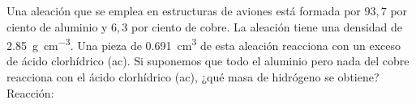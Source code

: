 Una aleación que se emplea en estructuras de aviones está formada por $93,7$ por ciento de aluminio y $6,3$ por ciento de cobre. La aleación tiene una densidad de \SI{2,85}{\gram\per\cubic\centi\meter}. Una pieza de \SI{0,691}{\cubic\centi\meter} de esta aleación reacciona con un exceso de ácido clorhídrico (ac). Si suponemos que todo el aluminio pero nada del cobre reacciona con el ácido clorhídrico (ac), ¿qué masa de hidrógeno se obtiene?
    Reacción: 
